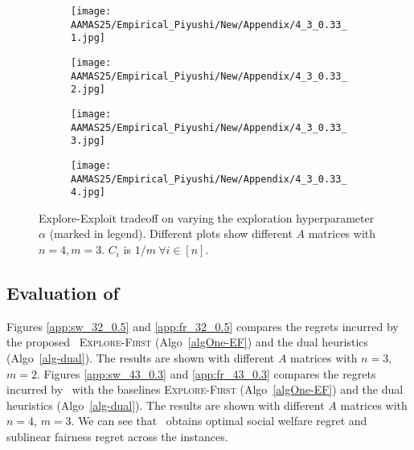 \begin{figure*}[ht!]
\centering
\begin{subfigure}{.24\textwidth}
    \centering
    \texttt{[image: AAMAS25/Empirical\_Piyushi/New/Appendix/4\_3\_0.33\_1.jpg]}  
    \label{ef4-1}
\end{subfigure}
\begin{subfigure}{.24\textwidth}
    \centering
    \texttt{[image: AAMAS25/Empirical\_Piyushi/New/Appendix/4\_3\_0.33\_2.jpg]}  
    \label{ef4-2}
\end{subfigure}
\begin{subfigure}{.24\textwidth}
    \centering
    \texttt{[image: AAMAS25/Empirical\_Piyushi/New/Appendix/4\_3\_0.33\_3.jpg]} 
    \label{ef4-3}
\end{subfigure}
\begin{subfigure}{.24\textwidth}
    \centering
    \texttt{[image: AAMAS25/Empirical\_Piyushi/New/Appendix/4\_3\_0.33\_4.jpg]} 
    \label{ef4-4}
\end{subfigure}
\vspace{-0.15in}
    \caption{Explore-Exploit tradeoff on varying the exploration hyperparameter $\alpha$ (marked in legend). Different plots show different $A$ matrices with $n=4, m=3$. $C_i$ is $1/m\ \forall i \in [n]$.}
    \label{fig:ef_n4m3}
\end{figure*} 

\subsection{Evaluation of \ouralgo\ }
Figures \ref{app:sw_32_0.5} and \ref{app:fr_32_0.5} compares the regrets incurred by the proposed \ouralgo\, \textsc{Explore-First} (Algo~\ref{algOne-EF}) and the dual heuristics (Algo~\ref{alg-dual}). The results are shown with different $A$ matrices with $n=3$, $m=2$. Figures \ref{app:sw_43_0.3} and \ref{app:fr_43_0.3} compares the regrets incurred by \ouralgo\ with the baselines \textsc{Explore-First} (Algo~\ref{algOne-EF}) and the dual heuristics (Algo~\ref{alg-dual}). The results are shown with different $A$ matrices with $n=4$, $m=3$. We can see that \ouralgo\ obtains optimal social welfare regret and sublinear fairness regret across the instances.

